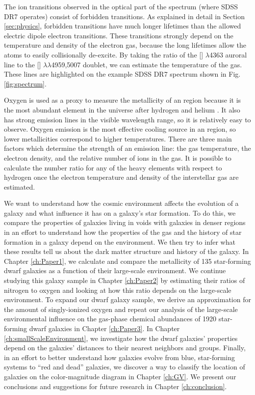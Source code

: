 The ion transitions observed in the optical part of the spectrum (where SDSS DR7 
operates) consist of forbidden transitions.  As explained in detail in Section 
\ref{sec:physics}, forbidden transitions have much longer lifetimes than the 
allowed electric dipole electron transitions.  These transitions strongly depend 
on the temperature and density of the electron gas, because the long lifetimes 
allow the atoms to easily collisionally de-excite.  By taking the ratio of the 
[] $\lambda$4363 auroral line to the [] 
$\lambda \lambda$4959,5007 doublet, we can estimate the temperature of the gas.  
These lines are highlighted on the example SDSS DR7 spectrum shown in Fig. 
\ref{fig:spectrum}.  

Oxygen is used as a proxy to measure the metallicity of an  region 
because it is the most abundant element in the universe after hydrogen and 
helium \citep{Emsley11}.  It also has strong emission lines in the visible 
wavelength range, so it is relatively easy to observe.  Oxygen emission is the 
most effective cooling source in an  region, so lower metallicities 
correspond to higher temperatures.  There are three main factors which determine 
the strength of an emission line: the gas temperature, the electron density, and 
the relative number of ions in the gas.  It is possible to calculate the number 
ratio for any of the heavy elements with respect to hydrogen once the electron 
temperature and density of the interstellar gas are estimated.


We want to understand how the cosmic environment affects the evolution of a 
galaxy and what influence it has on a galaxy's star formation.  To do this, we 
compare the properties of galaxies living in voids with galaxies in denser 
regions in an effort to understand how the properties of the gas and the history 
of star formation in a galaxy depend on the environment.  We then try to infer 
what these results tell us about the dark matter structure and history of the 
galaxy.  In Chapter \ref{ch:Paper1}, we calculate and compare the metallicity of 
135 star-forming dwarf galaxies as a function of their large-scale environment.  
We continue studying this galaxy sample in Chapter \ref{ch:Paper2} by estimating 
their ratios of nitrogen to oxygen and looking at how this ratio depends on the 
large-scale environment.  To expand our dwarf galaxy sample, we derive an 
approximation for the amount of singly-ionized oxygen and repeat our analysis of 
the large-scale environmental influence on the gas-phase chemical abundances of 
1920 star-forming dwarf galaxies in Chapter \ref{ch:Paper3}.  In Chapter 
\ref{ch:smallScaleEnvironment}, we investigate how the dwarf galaxies' 
properties depend on the galaxies' distances to their nearest neighbors and 
groups.  Finally, in an effort to better understand how galaxies evolve from 
blue, star-forming systems to ``red and dead'' galaxies, we discover a way to 
classify the location of galaxies on the color-magnitude diagram in Chapter 
\ref{ch:GV}.  We present our conclusions and suggestions for future research in 
Chapter \ref{ch:conclusion}.